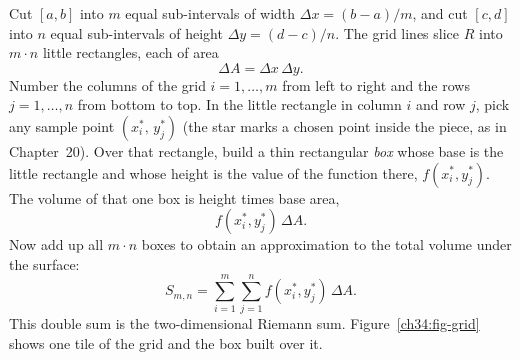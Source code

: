 Cut $[a,b]$ into $m$ equal sub-intervals of width $\Delta x=(b-a)/m$, and cut
$[c,d]$ into $n$ equal sub-intervals of height $\Delta y=(d-c)/n$. The grid lines
slice $R$ into $m\cdot n$ little rectangles, each of area
\[
  \Delta A=\Delta x\,\Delta y .
\]
Number the columns of the grid $i=1,\dots,m$ from left to right and the rows
$j=1,\dots,n$ from bottom to top. In the little rectangle in column $i$ and row
$j$, pick any sample point $(x_i^\ast,\,y_j^\ast)$ (the star marks a chosen point
inside the piece, as in Chapter~20). Over that rectangle, build a thin rectangular
\emph{box} whose base is the little rectangle and whose height is the value of
the function there, $f(x_i^\ast,y_j^\ast)$. The volume of that one box is
height times base area,
\[
  f(x_i^\ast,y_j^\ast)\,\Delta A .
\]
Now add up all $m\cdot n$ boxes to obtain an approximation to the total
volume under the surface:
\[
  S_{m,n}=\sum_{i=1}^{m}\sum_{j=1}^{n} f(x_i^\ast,y_j^\ast)\,\Delta A .
\]
This double sum is the two-dimensional Riemann sum. Figure~\ref{ch34:fig-grid}
shows one tile of the grid and the box built over it.

